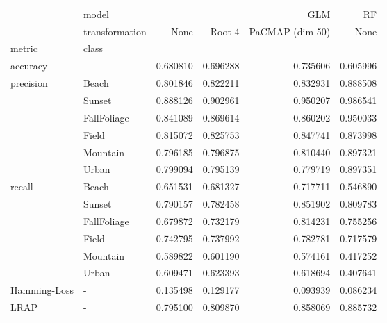 \begin{tabular}{llrrrr}
\toprule
 & model & \multicolumn{3}{r}{GLM} & RF \\
 & transformation & None & Root 4 & PaCMAP (dim 50) & None \\
metric & class &  &  &  &  \\
\midrule
accuracy & - & 0.680810 & 0.696288 & 0.735606 & 0.605996 \\
\cline{1-6}
\multirow[t]{6}{*}{precision} & Beach & 0.801846 & 0.822211 & 0.832931 & 0.888508 \\
 & Sunset & 0.888126 & 0.902961 & 0.950207 & 0.986541 \\
 & FallFoliage & 0.841089 & 0.869614 & 0.860202 & 0.950033 \\
 & Field & 0.815072 & 0.825753 & 0.847741 & 0.873998 \\
 & Mountain & 0.796185 & 0.796875 & 0.810440 & 0.897321 \\
 & Urban & 0.799094 & 0.795139 & 0.779719 & 0.897351 \\
\cline{1-6}
\multirow[t]{6}{*}{recall} & Beach & 0.651531 & 0.681327 & 0.717711 & 0.546890 \\
 & Sunset & 0.790157 & 0.782458 & 0.851902 & 0.809783 \\
 & FallFoliage & 0.679872 & 0.732179 & 0.814231 & 0.755256 \\
 & Field & 0.742795 & 0.737992 & 0.782781 & 0.717579 \\
 & Mountain & 0.589822 & 0.601190 & 0.574161 & 0.417252 \\
 & Urban & 0.609471 & 0.623393 & 0.618694 & 0.407641 \\
\cline{1-6}
Hamming-Loss & - & 0.135498 & 0.129177 & 0.093939 & 0.086234 \\
\cline{1-6}
LRAP & - & 0.795100 & 0.809870 & 0.858069 & 0.885732 \\
\cline{1-6}
\bottomrule
\end{tabular}
